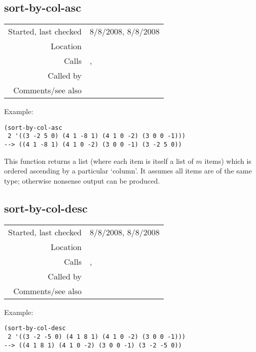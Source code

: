 \subsection*{sort-by-col-asc}\label{fun:sort-by-col-asc}

\vspace{0.3cm}
\begin{tabular}{r|p{8cm}}
Started, last checked & 8/8/2008, 8/8/2008 \\
Location & \nameref{sec:sort-by} \\
Calls & \nameref{fun:min-nth-argmin}, \nameref{fun:remove-nth} \\
Called by & \nameref{fun:sort-by-col} \\
Comments/see also &
\end{tabular}

\vspace{0.5cm}
\noindent Example:
\begin{verbatim}
(sort-by-col-asc
 2 '((3 -2 5 0) (4 1 -8 1) (4 1 0 -2) (3 0 0 -1)))
--> ((4 1 -8 1) (4 1 0 -2) (3 0 0 -1) (3 -2 5 0))
\end{verbatim}

\noindent This function returns a list (where each
item is itself a list of $m$ items) which is ordered
ascending by a particular `column'. It assumes all
items are of the same type; otherwise nonsense output
can be produced.


\subsection*{sort-by-col-desc}\label{fun:sort-by-col-desc}

\vspace{0.3cm}
\begin{tabular}{r|p{8cm}}
Started, last checked & 8/8/2008, 8/8/2008 \\
Location & \nameref{sec:sort-by} \\
Calls & \nameref{fun:max-nth-argmax}, \nameref{fun:remove-nth} \\
Called by & \nameref{fun:sort-by-col} \\
Comments/see also &
\end{tabular}

\vspace{0.5cm}
\noindent Example:
\begin{verbatim}
(sort-by-col-desc
 2 '((3 -2 -5 0) (4 1 8 1) (4 1 0 -2) (3 0 0 -1)))
--> ((4 1 8 1) (4 1 0 -2) (3 0 0 -1) (3 -2 -5 0))
\end{verbatim}

